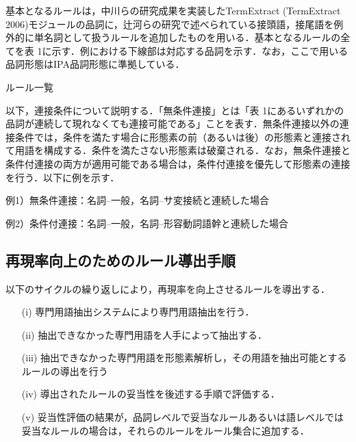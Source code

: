 \documentclass[japanese]{jnlp_1.4}
\begin{document}
基本となるルールは，中川らの研究成果を実装したTermExtract (TermExtract 2006)モジュールの品詞に，辻河らの研究で述べられている接頭語，接尾語を例外的に単名詞として扱うルールを追加したものを用いる．基本となるルールの全てを表 1に示す．例における下線部は対応する品詞を示す．なお，ここで用いる品詞形態はIPA品詞形態に準拠している．

\begin{table}[b]
\caption{ルール一覧}

\end{table}

以下，連接条件について説明する．「無条件連接」とは「表 1にあるいずれかの品詞が連続して現れなくても連接可能である」ことを表す．無条件連接以外の連接条件では，条件を満たす場合に形態素の前（あるいは後）の形態素と連接されて用語を構成する．条件を満たさない形態素は破棄される．なお，無条件連接と条件付連接の両方が適用可能である場合は，条件付連接を優先して形態素の連接を行う．以下に例を示す．

\noindent
例1）無条件連接：名詞--一般，名詞--サ変接続と連続した場合

\vspace{1zw}
\vspace{1zw}

\noindent
例2）条件付連接：名詞--一般，名詞--形容動詞語幹と連続した場合

\vspace{1zw}
\vspace{1zw}




\subsection{再現率向上のためのルール導出手順}

以下のサイクルの繰り返しにより，再現率を向上させるルールを導出する．

\begin{itemize}
\item[(i)]
専門用語抽出システムにより専門用語抽出を行う．

\item[(ii)]
抽出できなかった専門用語を人手によって抽出する．

\item[(iii)]
抽出できなかった専門用語を形態素解析し，その用語を抽出可能とするルールの導出を行う

\item[(iv)]
導出されたルールの妥当性を後述する手順で評価する．

\item[(v)]
妥当性評価の結果が，品詞レベルで妥当なルールあるいは語レベルでは妥当なルールの場合は，それらのルールをルール集合に追加する．
\end{itemize}
\end{document}

